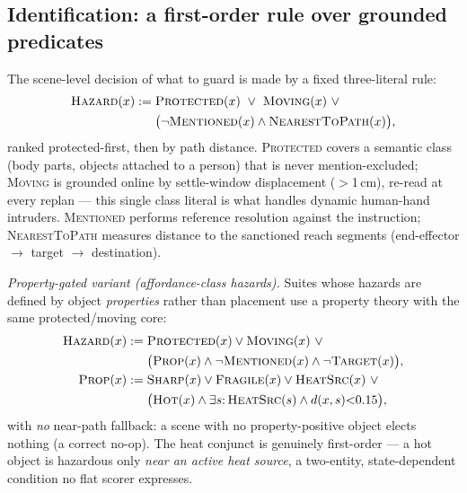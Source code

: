 \documentclass[conference]{IEEEtran}
\providecommand{\coloneqq}{\mathrel{:=}}
\begin{document}
\subsection{Identification: a first-order rule over grounded predicates}
\label{sec:ident}

The scene-level decision of what to guard is made by a fixed three-literal rule:
\begin{equation}
\begin{aligned}
\textsc{Hazard}(x) \coloneqq{}& \textsc{Protected}(x)\ \vee\ \textsc{Moving}(x)\ \vee \\
&\big(\lnot\textsc{Mentioned}(x)\wedge\textsc{NearestToPath}(x)\big),
\end{aligned}
\label{eq:fol}
\end{equation}
ranked protected-first, then by path distance. \textsc{Protected} covers a semantic class (body parts, objects attached to a person) that is never mention-excluded; \textsc{Moving} is grounded online by settle-window displacement ($>$1\,cm), re-read at every replan --- this single class literal is what handles dynamic human-hand intruders. \textsc{Mentioned} performs reference resolution against the instruction; \textsc{NearestToPath} measures distance to the sanctioned reach segments (end-effector $\to$ target $\to$ destination).

\emph{Property-gated variant (affordance-class hazards).} Suites whose hazards are defined by object \emph{properties} rather than placement use a property theory with the same protected/moving core:
\begin{equation}
\begin{aligned}
\textsc{Hazard}(x) \coloneqq{}& \textsc{Protected}(x)\vee\textsc{Moving}(x)\ \vee\\
&\big(\textsc{Prop}(x)\wedge\lnot\textsc{Mentioned}(x)\wedge\lnot\textsc{Target}(x)\big),\\
\textsc{Prop}(x) \coloneqq{}& \textsc{Sharp}(x)\vee\textsc{Fragile}(x)\vee\textsc{HeatSrc}(x)\ \vee\\
&\big(\textsc{Hot}(x)\wedge\exists s{:}\,\textsc{HeatSrc}(s)\wedge d(x,s){<}0.15\big),
\end{aligned}
\label{eq:folprop}
\end{equation}
with \emph{no} near-path fallback: a scene with no property-positive object elects nothing (a correct no-op). The heat conjunct is genuinely first-order --- a hot object is hazardous only \emph{near an active heat source}, a two-entity, state-dependent condition no flat scorer expresses.
\end{document}
